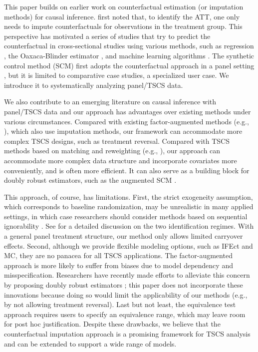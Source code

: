 \documentclass[12pt]{article}
\begin{document}
This paper builds on earlier work on counterfactual estimation (or imputation methods) for causal inference. \citet{heckman1997matching, heckman1998matching} first noted that, to identify the ATT, one only needs to impute counterfactuals for observations in the treatment group. This perspective has motivated a series of studies that try to predict the counterfactual in cross-sectional studies using various methods, such as regression \citep{lin2013agnostic}, the Oaxaca-Blinder estimator \citep{kline2011oaxaca}, and machine learning algorithms \citep{kunzel2019metalearners}. The synthetic control method (SCM) first adopts the counterfactual approach in a panel setting \citep{ADH2010}, but it is limited to comparative case studies, a specialized user case. We introduce it to systematically analyzing panel/TSCS data. 

We also contribute to an emerging literature on causal inference with panel/TSCS data and our approach has advantages over existing methods under various circumstances. Compared with existing factor-augmented methods (e.g., \citealt{GobillonMagnac2016,xu2017generalized}), which also use imputation methods, our framework can accommodate more complex TSCS designs, such as treatment reversal. Compared with TSCS methods based on matching and reweighting (e.g., \citealt{Abadie2005,ImaiKim2019,strezhnev2018,callaway2020difference,de_Chaisemartin2018-iw}), our approach can accommodate more complex data structure and incorporate covariates more conveniently, and is often more efficient. It can also serve as a building block for doubly robust estimators, such as the augmented SCM \citep{BFR2019}. 

This approach, of course, has limitations. First, the strict exogeneity assumption, which corresponds to baseline randomization, may be unrealistic in many applied settings, in which case researchers should consider methods based on sequential ignorability \citep{blackwell2018make, imai2018matching,hazlettxu2018}. See \cite{Xu2022-hw} for a detailed discussion on the two identification regimes. With a general panel treatment structure, our method only allows limited carryover effects. Second, although we provide flexible modeling options, such as IFEct and MC, they are no panacea for all TSCS applications. The factor-augmented approach is more likely to suffer from biases due to model dependency and misspecification. Researchers have recently made efforts to alleviate this concern by proposing doubly robust estimators \citep[e.g.,][]{BFR2019,Arkhangelsky2019-lz}; this paper does not incorporate these innovations because doing so would limit the applicability of our methods (e.g., by not allowing treatment reversal). Last but not least, the equivalence test approach requires users to specify an equivalence range, which may leave room for post hoc justification. Despite these drawbacks, we believe that the counterfactual imputation approach is a promising framework for TSCS analysis and can be extended to support a wide range of models. 
\end{document}
